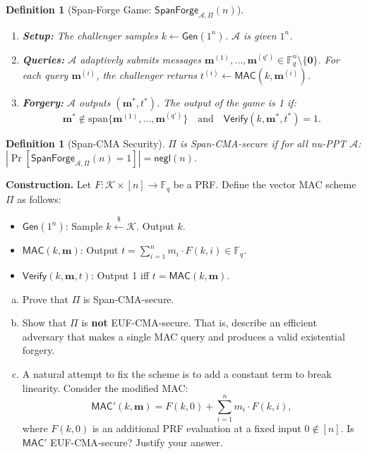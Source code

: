 \documentclass[11pt]{article}
\newtheorem{definition}[theorem]{Definition}
\numberwithin{equation}{section}
\begin{document}
\begin{enumerate}
    \begin{definition}[Span-Forge Game: $\mathsf{SpanForge}_{\mathcal{A},\Pi}(n)$]\label{def:spanforge}~
    \begin{enumerate}
        \item \textbf{Setup:} The challenger samples $k \leftarrow \mathsf{Gen}(1^n)$. $\mathcal{A}$ is given $1^n$.
        \item \textbf{Queries:} $\mathcal{A}$ adaptively submits messages $\mathbf{m}^{(1)}, \dots, \mathbf{m}^{(q')}  \in \mathbb{F}_q^n \setminus \{\mathbf{0}\}$. For each query $\mathbf{m}^{(i)}$, the challenger returns $t^{(i)} \leftarrow \mathsf{MAC}(k, \mathbf{m}^{(i)})$.
        \item \textbf{Forgery:} $\mathcal{A}$ outputs $(\mathbf{m}^*, t^*)$. The output of the game is 1 if:
        \[
            \mathbf{m}^* \notin \mathrm{span}\{\mathbf{m}^{(1)}, \dots, \mathbf{m}^{(q')}\} \quad \text{and} \quad \mathsf{Verify}(k, \mathbf{m}^*, t^*) = 1.
        \]
    \end{enumerate}
    \end{definition}

    \begin{definition}[Span-CMA Security]
    $\Pi$ is \emph{Span-CMA-secure} if for all nu-PPT $\mathcal{A}$:
    $\left|\Pr[\mathsf{SpanForge}_{\mathcal{A},\Pi}(n) = 1]\right| = \mathsf{negl}(n)$.
    \end{definition}

    \medskip
    \noindent\textbf{Construction.} Let $F : \mathcal{K} \times [n] \to \mathbb{F}_q$ be a PRF. Define the vector MAC scheme $\Pi$ as follows:
    \begin{itemize}
        \item $\mathsf{Gen}(1^n)$: Sample $k \xleftarrow{\$} \mathcal{K}$. Output $k$.
        \item $\mathsf{MAC}(k, \mathbf{m})$: Output $t = \sum_{i=1}^{n} m_i \cdot F(k, i) \in \mathbb{F}_q$.
        \item $\mathsf{Verify}(k, \mathbf{m}, t)$: Output 1 iff $t = \mathsf{MAC}(k, \mathbf{m})$.
    \end{itemize}

    \begin{enumerate}[(a)]
        \item Prove that $\Pi$ is Span-CMA-secure.
        \item Show that $\Pi$ is \textbf{not} EUF-CMA-secure. That is, describe an efficient adversary that makes a single MAC query and produces a valid existential forgery.
        \item A natural attempt to fix the scheme is to add a constant term to break linearity. Consider the modified MAC:
        \[
            \mathsf{MAC}'(k, \mathbf{m}) = F(k, 0) + \sum_{i=1}^{n} m_i \cdot F(k, i),
        \]
        where $F(k, 0)$ is an additional PRF evaluation at a fixed input $0 \notin [n]$. Is $\mathsf{MAC}'$ EUF-CMA-secure? Justify your answer.
    \end{enumerate}

    

\end{enumerate}
\end{document}
